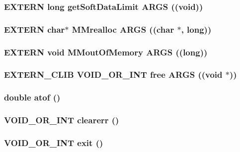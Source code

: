 \subsubsection{\setlength{\rightskip}{0pt plus 5cm}EXTERN long get\-Soft\-Data\-Limit ARGS ((void))}\label{util_8h_d80f1e3b1c4724f4dbe93275f12d5a06}


\subsubsection{\setlength{\rightskip}{0pt plus 5cm}EXTERN char$\ast$ MMrealloc ARGS ((char $\ast$, long))}\label{util_8h_46133835388db11f4ec54390cd4d4edc}


\subsubsection{\setlength{\rightskip}{0pt plus 5cm}EXTERN void \bf{MMout\-Of\-Memory} ARGS ((long))}\label{util_8h_4d7a0860d63973cfb22e57e9c311f6df}


\subsubsection{\setlength{\rightskip}{0pt plus 5cm}EXTERN\_\-CLIB VOID\_\-OR\_\-INT free ARGS ((void $\ast$))}\label{util_8h_c5ac81f033cfd9ace9820fc605d94e0e}


\subsubsection{\setlength{\rightskip}{0pt plus 5cm}double atof ()}\label{util_8h_d37d469faf1f38a3c35d1253575a513a}


\subsubsection{\setlength{\rightskip}{0pt plus 5cm}VOID\_\-OR\_\-INT clearerr ()}\label{util_8h_a0dcd6854464d4d886261196e5d21642}


\subsubsection{\setlength{\rightskip}{0pt plus 5cm}VOID\_\-OR\_\-INT exit ()}\label{util_8h_43b6ea6be735bb828bc062c70cadeff8}




